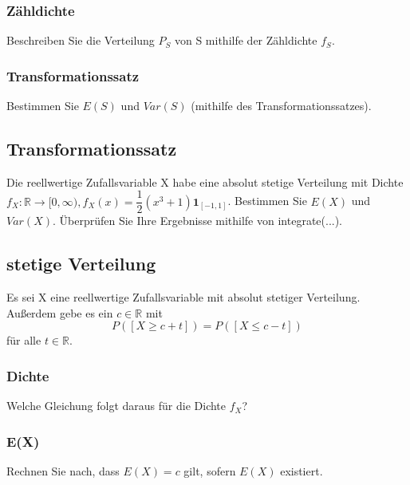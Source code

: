 \documentclass[paper=a4, fontsize=11pt]{scrartcl}
\numberwithin{equation}{section}
\numberwithin{figure}{section}
\numberwithin{table}{section}
\begin{document}
\subsubsection{Zähldichte}
Beschreiben Sie die Verteilung $P_{S}$ von S mithilfe der Zähldichte $f_{S}$. \\

\subsubsection{Transformationssatz}
Bestimmen Sie $E(S)$ und $Var(S)$ (mithilfe des Transformationssatzes). \\

\subsection{Transformationssatz}
Die reellwertige Zufallsvariable X habe eine absolut stetige Verteilung mit Dichte $f_{X}: \mathbb{R} \rightarrow [0, \infty), f_{X}(x)= \dfrac{1}{2}(x^{3}+1) \textbf{1} _{[-1,1]}$. Bestimmen Sie $E(X)$ und $Var(X)$. Überprüfen Sie Ihre Ergebnisse mithilfe von integrate(...). \\

\subsection{stetige Verteilung}
Es sei X eine reellwertige Zufallsvariable mit absolut stetiger Verteilung. Außerdem gebe es ein $c \in \mathbb{R}$ mit
$$P([X \geq c+t]) = P([X \leq c-t])$$
für alle $t \in \mathbb{R}$. 

\subsubsection{Dichte}
Welche Gleichung folgt daraus für die Dichte $f_{X}$? \\

\subsubsection{E(X)}
Rechnen Sie nach, dass $E(X)=c$ gilt, sofern $E(X)$ existiert. \\

\end{document}
